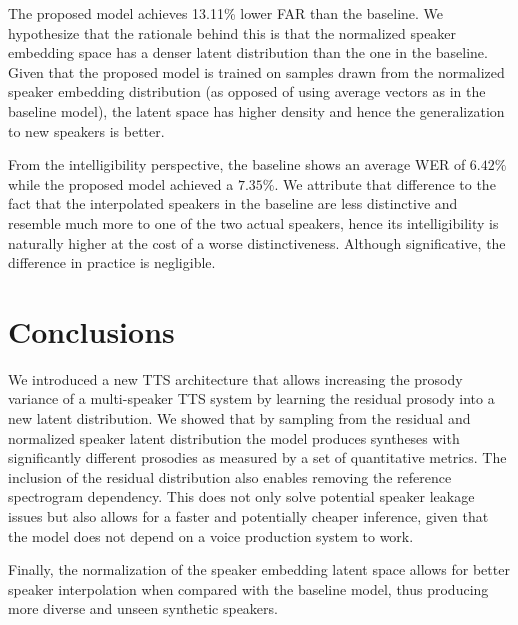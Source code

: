 The proposed model achieves 13.11\% lower FAR than the baseline. We hypothesize that the rationale behind this is that the normalized speaker embedding space has a denser latent distribution than the one in the baseline. Given that the proposed model is trained on samples drawn from the normalized speaker embedding distribution (as opposed of using average vectors as in the baseline model), the latent space has higher density and hence the generalization to new speakers is better.



From the intelligibility perspective, the baseline shows an average WER of $6.42\%$ while the proposed model achieved a $7.35\%$. We attribute that difference to the fact that the interpolated speakers in the baseline are less distinctive and resemble much more to one of the two actual speakers, hence its intelligibility is naturally higher at the cost of a worse distinctiveness. Although significative, the difference in practice is negligible.


\section{Conclusions}


We introduced a new TTS architecture that allows increasing the prosody variance of a multi-speaker TTS system by learning the residual prosody into a new latent distribution. We showed that by sampling from the residual and normalized speaker latent distribution the model produces syntheses with significantly different prosodies as measured by a set of quantitative metrics. The inclusion of the residual distribution also enables removing the reference spectrogram dependency. This does not only solve potential speaker leakage issues but also allows for a faster and potentially cheaper inference, given that the model does not depend on a voice production system to work.


Finally, the normalization of the speaker embedding latent space allows for better speaker interpolation when compared with the baseline model, thus producing more diverse and unseen synthetic speakers. 


